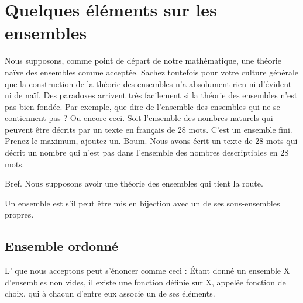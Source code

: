 
\section{Quelques éléments sur les ensembles}

Nous supposons, comme point de départ de notre mathématique, une théorie naïve des ensembles comme acceptée. Sachez toutefois pour votre culture générale que la construction de la théorie des ensembles n'a absolument rien ni d'évident ni de naïf. Des paradoxes arrivent très facilement si la théorie des ensembles n'est pas bien fondée. Par exemple, que dire de l'ensemble des ensembles qui ne se contiennent pas ? Ou encore ceci. Soit l'ensemble des nombres naturels qui peuvent être décrits par un texte en français de 28 mots. C'est un ensemble fini. Prenez le maximum, ajoutez un. Boum. Nous avons écrit un texte de 28 mots qui décrit un nombre qui n'est pas dans l'ensemble des nombres descriptibles en 28 mots.

Bref. Nous supposons avoir une théorie des ensembles qui tient la route.

\begin{definition}      \label{DefEOZLooUMCzZR}
    Un ensemble est  s'il peut être mis en bijection avec un de ses sous-ensembles propres.
\end{definition}

\subsection{Ensemble ordonné}

\begin{normaltext}\label{NORooLMBYooYjUoju}
L' que nous acceptons peut s'énoncer comme ceci\cite{ooKLIXooHbpufL} : Étant donné un ensemble X d'ensembles non vides, il existe une fonction définie sur X, appelée fonction de choix, qui à chacun d'entre eux associe un de ses éléments. 
\end{normaltext}

